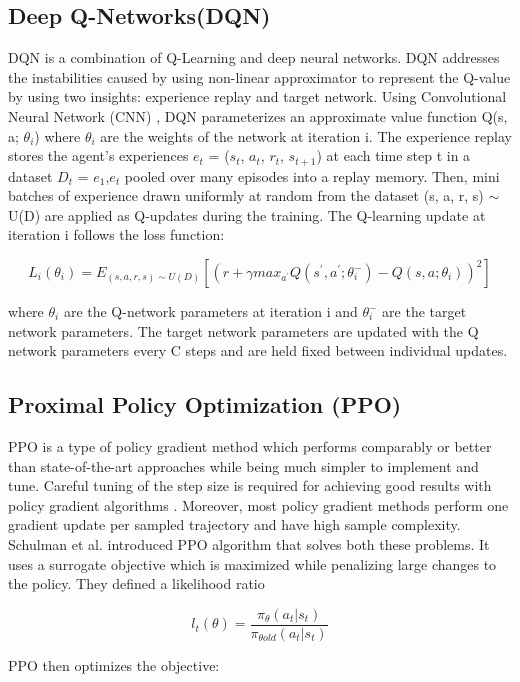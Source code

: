 \documentclass[12pt]{report}
\begin{document}
\subsection{Deep Q-Networks(DQN)} DQN is a combination of Q-Learning and deep neural networks. DQN addresses the instabilities caused by using non-linear approximator to represent the Q-value by using two insights: experience replay and target network. 
Using Convolutional Neural Network (CNN) , DQN parameterizes an approximate value function Q(s, a; $\theta_i$) where $\theta_i$ are the weights of the network at iteration i. The experience replay stores the agent’s experiences $e_t$ = ($s_t$, $a_t$, $r_t$, $s_{t+1}$) at each time step t in a dataset $D_t$ = $e_1$,$e_t$ pooled over many episodes into a replay
memory. Then, mini batches of experience drawn uniformly at random from the dataset (s, a, r, s) $\sim$ U(D) are applied as Q-updates during the training. The
Q-learning update at iteration i follows the loss function:

\[ L_i (\theta_i) = E_{(s,a,r,s) \sim U(D) } [(r +  \gamma max_{a^{'}} Q(s^{'}, a^{'} ; \theta_i^{-}) - Q(s,a; \theta_{i}))^2] \]

\hfill \break
where $\theta_i$ are the Q-network parameters at iteration i and $\theta_i^{-}$  are the target network parameters. The target network parameters are updated with the Q network parameters every C steps and are held fixed between individual updates. \\

\subsection{Proximal Policy Optimization (PPO)} PPO is a type of policy gradient method which performs  comparably or better than state-of-the-art approaches while being much simpler to implement and tune. Careful tuning of the step size is required for achieving good results with policy gradient algorithms \cite{PPO}. Moreover, most policy gradient methods perform one gradient update per sampled trajectory and have high sample complexity. Schulman et al. \cite{Schulman} introduced PPO algorithm that solves both these problems. It uses a surrogate objective which is maximized while penalizing large changes to the policy. 
They defined a likelihood ratio 

\[ l_t(\theta) = \frac{\pi_\theta(a_t | s_t)}{\pi_{\theta old}(a_t | s_t)}\]

\hfill \break
PPO then optimizes the objective: 
\end{document}
